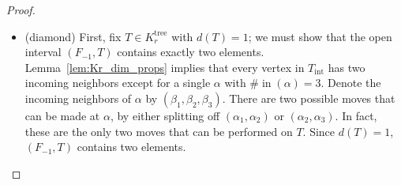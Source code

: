 \documentclass[11pt]{amsart}
\theoremstyle{definition}
\theoremstyle{remark}
\theoremstyle{plain}
\newcommand{\sB}{\mathscr{B}}
\newcommand{\on}{\operatorname}
\newcommand{\incom}{\on{in}}
\newcommand{\inte}{{\on{int}}}
\newcommand{\tree}{{\on{tree}}}
\newcommand{\br}{{\on{br}}}
\newcommand{\wh}{\widehat}
\newcommand{\wt}{\widetilde}
\begin{document}
\begin{proof}
\begin{itemize}
\begin{figure}[H]
\centering
\def\svgwidth{0.9\columnwidth}

\end{figure}

\begin{figure}[H]
\centering
\def\svgwidth{0.95\columnwidth}

\end{figure}

Next, we show that for any $T \in K_r^\tree$ with $d(T) \geq 2$, the interval $[F_{-1},T]$ is connected.
By Def.-Lem.~\ref{deflem:gammaT}, $[F_{-1},T]$ is isomorphic to $\{F_{-1}\} \cup \prod_{\alpha \in T_\inte} K_{\#\!\incom(\alpha)}^\tree$.
The connectedness of $\wh{K^\tree_s}$
for $s \geq 4$, the fact that $K^\tree_3$ is isomorphic to the face poset of an interval, and the inequality $\sum_{\alpha \in T_\inte} (\#\incom(\alpha)-2) = d(T) \geq 2$ 
imply that $\{F_{-1}\} \cup \prod_{\alpha \in T_\inte} K_{\#\!\incom(\alpha)}^\tree$ is connected.

Finally, we show that for any $\sB,\sB'$ with $\sB' < \sB$ and $d(\sB') \leq d(\sB)-3$, the interval $[\sB',\sB]$ is connected.
Extend the dimension function $d$ to $K_r^\br$ via the identification $K_r^\br \simeq K_r^\tree$.
Then
$d(\sB) = 2r - \#\!\sB - 1$.
To prove that $[\sB',\sB]$ is connected, it suffices to show that for any distinct $\wt\sB^1, \wt\sB^2 \in (\sB',\sB)$ with $d(\wt\sB^1) = d(\wt\sB^2) = d(\sB)-1$, there is a path from $\wt\sB^1$ to $\wt\sB^2$ in $(\sB',\sB)$.
The inequality $\wt\sB^j \geq \sB'$ for $j \in \{1,2\}$ implies that $\wh\sB \coloneqq \wt\sB^1 \cup \wt\sB^2$ is a 1-bracketing.
Moreover, it satisfies $\wh\sB \in [\sB',\sB)$, and by the formula for the dimension of a 1-bracketing given above, it satisfies $d(\wh\sB) = d(\sB) - 2$.
By the hypothesis $d(\sB') \leq d(\sB) - 3$, $\wh\sB$ must therefore lie in $(\sB',\sB)$, so $(\wt\sB^1,\wh\sB,\wt\sB^2)$ is a path in $(\sB',\sB)$.

\medskip

\item[] {\sc(diamond)}
First, fix $T \in K_r^\tree$ with $d(T) = 1$; we must show that the open interval $(F_{-1},T)$ contains exactly two elements.
Lemma~\ref{lem:Kr_dim_props} implies that every vertex in $T_\inte$ has two incoming neighbors except for a single $\alpha$ with $\#\!\incom(\alpha) = 3$.
Denote the incoming neighbors of $\alpha$ by $(\beta_1,\beta_2,\beta_3)$.
There are two possible moves that can be made at $\alpha$, by either splitting off $(\alpha_1,\alpha_2)$ or $(\alpha_2,\alpha_3)$.
In fact, these are the only two moves that can be performed on $T$.
Since $d(T) = 1$, $(F_{-1},T)$ contains two elements.


\end{itemize}
\end{proof}
\end{document}
